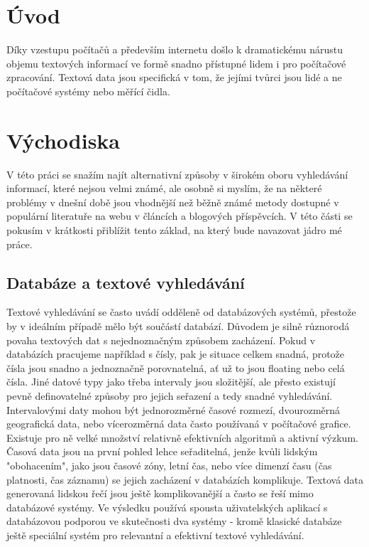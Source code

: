 \documentclass[11pt]{article}
\begin{document}
\section{Úvod}
Díky vzestupu počítačů a především internetu došlo k dramatickému
nárustu objemu textových informací ve formě snadno přístupné lidem i pro
počítačové zpracování. Textová data jsou specifická v tom, že jejími
tvůrci jsou lidé a ne počítačové systémy nebo měřící čidla. 

\section{Východiska}
V této práci se snažím najít alternativní způsoby v širokém oboru vyhledávání
informací, které nejsou velmi známé, ale osobně si myslím, že na některé
problémy v dnešní době jsou vhodnější než běžně známé metody dostupné v
populární literatuře na webu v článcích a blogových příspěvcích. V této části
se pokusím v krátkosti přiblížit tento základ, na který bude navazovat jádro mé
práce.

\subsection{Databáze a textové vyhledávání}
Textové vyhledávání se často uvádí odděleně od databázových systémů, přestože
by v ideálním případě mělo být součástí databází. Důvodem je silně různorodá
povaha textových dat s nejednoznačným způsobem zacházení. Pokud v databázích
pracujeme například s čísly, pak je situace celkem snadná, protože čísla jsou
snadno a jednoznačně porovnatelná, ať už to jsou floating nebo celá čísla. Jiné
datové typy jako třeba intervaly jsou složitější, ale přesto existují pevně
definovatelné způsoby pro jejich seřazení a tedy snadné vyhledávání.
Intervalovými daty mohou být jednorozměrné časové rozmezí, dvourozměrná
geografická data, nebo vícerozměrná data často používaná v počítačové grafice.
Existuje pro ně velké množství relativně efektivních algoritmů a aktivní
výzkum. Časová data jsou na první pohled lehce seřaditelná, jenže kvůli lidským
"obohacením", jako jsou časové zóny, letní čas, nebo více dimenzí času (čas
platnosti, čas záznamu) se jejich zacházení v databázích komplikuje. Textová
data generovaná lidskou řečí jsou ještě komplikovanější a často se řeší mimo
databázové systémy. Ve výsledku používá spousta uživatelských aplikací s
databázovou podporou ve skutečnosti dva systémy - kromě klasické databáze ještě
speciální systém pro relevantní a efektivní textové vyhledávání.
\end{document}
